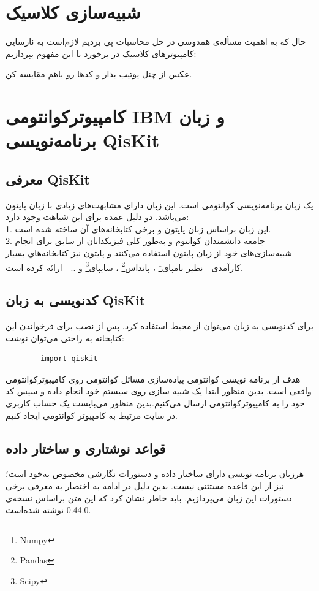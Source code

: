 \documentclass{book}
\begin{document}
\section{شبیه‌سازی کلاسیک}
حال که به اهمیت مسأله‌ی همدوسی در حل محاسبات پی بردیم لازم‌است به نارسایی کامپیوتر‌های کلاسیک در برخورد با این مفهوم بپردازیم:

عکس از چنل یوتیب بذار و کدها رو باهم مقایسه کن.


\newpage
\section{کامپیوترکوانتومی IBM و زبان برنامه‌نویسی QisKit}\label{sec:Qiskit}

\subsection{معرفی QisKit}
یک زبان برنامه‌نویسی کوانتومی است. این زبان دارای مشابهت‌های زیادی با زبان پایتون می‌باشد. دو دلیل عمده برای این شباهت وجود دارد:\\
 1. این زبان براساس زبان پایتون و برخی کتابخانه‌های آن ساخته شده است. \\
 2. جامعه دانشمندان کوانتوم و به‌طور کلی فیزیکدانان از سابق برای انجام شبیه‌سازی‌های خود از زبان پایتون استفاده می‌کنند و پایتون نیز کتابخانه‌هاي بسیار کارآمدی - نظیر نامپای\footnote{Numpy} ، پانداس\footnote{Pandas} ، سایپای\footnote{Scipy} و .. - ارائه کرده است.

\subsection{کدنویسی به زبان QisKit}
برای کدنویسی به زبان  می‌توان از محیط  استفاده کرد. پس از نصب  برای فرخواندن این کتابخانه به راحتی می‌توان نوشت:

\begin{latin}
	\begin{verbatim}
		import qiskit
	\end{verbatim}
\end{latin}

هدف از برنامه نویسی کوانتومی پیاده‌سازی مسائل کوانتومی روی کامپیوتر‌کوانتومی‌ واقعی است. بدین منظور ابتدا یک شبیه سازی روی سیستم خود انجام داده و سپس کد خود را به کامپیوتر‌کوانتومی  ارسال می‌کنیم.بدین منظور می‌بایست یک حساب کاربری در سایت مرتبط به کامپیوتر کوانتومی  ایجاد کنیم.


\subsection{قواعد نوشتاری و ساختار داده}
هرزبان برنامه نویسی دارای ساختار داده و دستورات نگارشی مخصوص به‌خود است؛  نیز از این قاعده مستثنی نیست. بدین دلیل در ادامه به اختصار به معرفی برخی دستورات این زبان می‌پردازیم. باید خاطر نشان کرد که این متن براساس  نسخه‌ی  0.44.0 نوشته‌ شده‌است.
\end{document}
